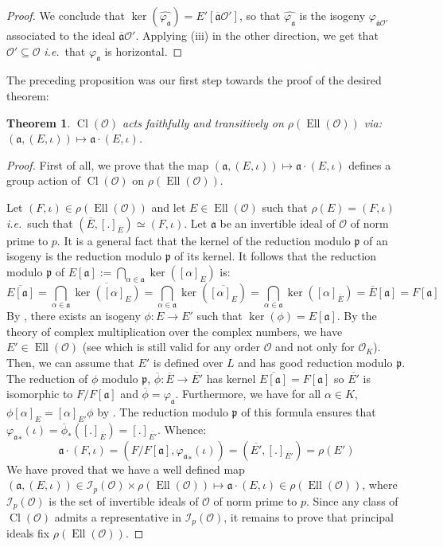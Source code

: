 \documentclass[a4paper,10pt]{report}
\theoremstyle{definition}
\theoremstyle{plain}
\newtheorem{theorem}[definition]{Theorem}
\theoremstyle{definition}
\newcommand{\ie}{\emph{i.e.}\ }
\newcommand{\mO}{\mathcal{O}}
\renewcommand{\(}{\left(}
\renewcommand{\)}{\right)}
\newcommand{\mf}[1]{\mathfrak{#1}}
\newcommand{\mfp}{\mathfrak{p}}
\DeclareMathOperator{\Cl}{Cl}
\DeclareMathOperator{\Ell}{Ell}
\begin{document}
\begin{proof}
We conclude that $\ker(\widehat{\varphi_{\mf{a}}})=E'[\overline{\mf{a}}\mO']$, so that $\widehat{\varphi_{\mf{a}}}$ is the isogeny $\varphi_{\overline{\mf{a}}\mO'}$ associated to the ideal $\overline{\mf{a}}\mO'$. Applying (iii) in the other direction, we get that $\mO'\subseteq\mO$ \ie that $\varphi_{\mf{a}}$ is horizontal.
\end{proof}

The preceding proposition was our first step towards the proof of the desired theorem:

\begin{theorem}\label{theorem 3}
$\Cl(\mO)$ acts faithfully and transitively on $\rho(\Ell(\mO))$ via: $(\mf{a},(E,\iota))\longmapsto \mf{a}\cdot (E,\iota)$.
\end{theorem}

\begin{proof}
First of all, we prove that the map $(\mf{a},(E,\iota))\longmapsto \mf{a}\cdot (E,\iota)$ defines a group action of $\Cl(\mO)$ on $\rho(\Ell(\mO))$. 

Let $(F,\iota)\in \rho(\Ell(\mO))$ and let $E\in\Ell(\mO)$ such that $\rho(E)=(F,\iota)$ \ie such that $(\overline{E},[.]_{\overline{E}})\simeq (F,\iota)$.  Let $\mf{a}$ be an invertible ideal of $\mO$ of norm prime to $p$. It is a general fact that the kernel of the reduction modulo $\mfp$ of an isogeny is the reduction modulo $\mfp$ of its kernel. It follows that the reduction modulo $\mfp$ of $E[\mf{a}]:=\bigcap_{\alpha\in\mf{a}}\ker([\alpha]_E)$ is:
\[\overline{E[\mf{a}]}=\bigcap_{\alpha\in\mf{a}}\overline{\ker([\alpha]_E)}=\bigcap_{\alpha\in\mf{a}}\ker(\overline{[\alpha]_E})=\bigcap_{\alpha\in\mf{a}}\ker([\alpha]_{\overline{E}})=\overline{E}[\mf{a}]=F[\mf{a}]\]
By \cite[proposition III.4.12]{Silverman1}, there exists an isogeny $\phi : E\longrightarrow E'$ such that $\ker(\phi)=E[\mf{a}]$. By the theory of complex multiplication over the complex numbers,  we have $E'\in\Ell(\mO)$ (see \cite[proposition II.2.1.(a).(ii)]{Silverman2} which is still valid for any order $\mO$ and not only for $\mO_K$). Then, we can assume that $E'$ is defined over $L$ and has good reduction modulo $\mfp$. The reduction of $\phi$ modulo $\mfp$, $\overline{\phi}:\overline{E}\longrightarrow\overline{E'}$ has kernel $\overline{E[\mf{a}]}=F[\mf{a}]$ so $\overline{E'}$ is isomorphic to $F/F[\mf{a}]$ and $\overline{\phi}=\varphi_{\mf{a}}$. Furthermore, we have for all $\alpha\in K$, $\phi[\alpha]_E=[\alpha]_{E'}\phi$ by \cite[corollary II.1.1.1]{Silverman2}. The reduction modulo $\mfp$ of this formula ensures that ${\varphi_{\mf{a}}}_*(\iota)=\overline{\phi}_*([.]_{\overline{E}})=[.]_{\overline{E'}}$. Whence: 
\[\mf{a}\cdot(F,\iota)=(F/F[\mf{a}],{\varphi_{\mf{a}}}_*(\iota))=(\overline{E'},[.]_{\overline{E'}})=\rho(E')\]
We have proved that we have a well defined map $(\mf{a},(E,\iota))\in\mathcal{I}_p(\mO)\times\rho(\Ell(\mO))\longmapsto \mf{a}\cdot (E,\iota)\in\rho(\Ell(\mO))$, where $\mathcal{I}_p(\mO)$ is the set of invertible ideals of $\mO$ of norm prime to $p$. Since any class of $\Cl(\mO)$ admits a representative in $\mathcal{I}_p(\mO)$, it remains to prove that principal ideals fix $\rho(\Ell(\mO))$. 


\end{proof}
\end{document}
